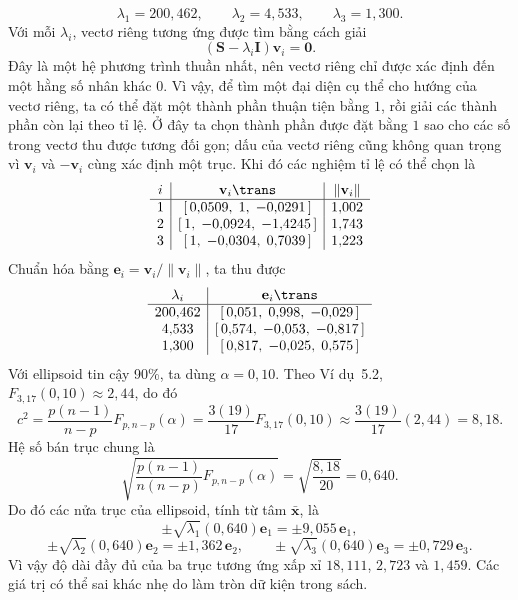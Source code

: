\begin{enumerate}[label=(\alph*)]
    \[
        \lambda_1=200{,}462,\qquad
        \lambda_2=4{,}533,\qquad
        \lambda_3=1{,}300.
    \]
    Với mỗi $\lambda_i$, vectơ riêng tương ứng được tìm bằng cách giải
    \[
        (\mathbf{S}-\lambda_i\mathbf{I})\mathbf{v}_i=\mathbf{0}.
    \]
    Đây là một hệ phương trình thuần nhất, nên vectơ riêng chỉ được xác định đến một hằng số nhân khác $0$. Vì vậy, để tìm một đại diện cụ thể cho hướng của vectơ riêng, ta có thể đặt một thành phần thuận tiện bằng $1$, rồi giải các thành phần còn lại theo tỉ lệ. Ở đây ta chọn thành phần được đặt bằng $1$ sao cho các số trong vectơ thu được tương đối gọn; dấu của vectơ riêng cũng không quan trọng vì $\mathbf{v}_i$ và $-\mathbf{v}_i$ cùng xác định một trục. Khi đó các nghiệm tỉ lệ có thể chọn là
    \[
    \begin{array}{c|c|c}
        i & \mathbf{v}_i\trans & \|\mathbf{v}_i\| \\ \hline
        1 & [\,0{,}0509,\;1,\;-0{,}0291\,] & 1{,}002\\
        2 & [\,1,\;-0{,}0924,\;-1{,}4245\,] & 1{,}743\\
        3 & [\,1,\;-0{,}0304,\;0{,}7039\,] & 1{,}223
    \end{array}
    \]
    Chuẩn hóa bằng $\mathbf{e}_i=\mathbf{v}_i/\|\mathbf{v}_i\|$, ta thu được
    \[
    \begin{array}{c|c}
        \lambda_i & \mathbf{e}_i\trans \\ \hline
        200{,}462 & [\,0{,}051,\;0{,}998,\;-0{,}029\,]\\
        4{,}533 & [\,0{,}574,\;-0{,}053,\;-0{,}817\,]\\
        1{,}300 & [\,0{,}817,\;-0{,}025,\;0{,}575\,]
    \end{array}
    \]
    Với ellipsoid tin cậy 90\%, ta dùng $\alpha=0{,}10$. Theo Ví dụ~5.2, $F_{3,17}(0{,}10)\approx 2{,}44$, do đó
    \[
        c^2 = \frac{p(n-1)}{n-p}F_{p,n-p}(\alpha)
        = \frac{3(19)}{17}F_{3,17}(0{,}10)
        \approx \frac{3(19)}{17}(2{,}44)
        = 8{,}18.
    \]
    Hệ số bán trục chung là
    \[
        \sqrt{\frac{p(n-1)}{n(n-p)}F_{p,n-p}(\alpha)}
        = \sqrt{\frac{8{,}18}{20}}
        = 0{,}640.
    \]
    Do đó các nửa trục của ellipsoid, tính từ tâm $\bar{\mathbf{x}}$, là
    \[
        \pm\sqrt{\lambda_1}(0{,}640)\mathbf{e}_1
        = \pm 9{,}055\,\mathbf{e}_1,
    \]
    \[
        \pm\sqrt{\lambda_2}(0{,}640)\mathbf{e}_2
        = \pm 1{,}362\,\mathbf{e}_2,
        \qquad
        \pm\sqrt{\lambda_3}(0{,}640)\mathbf{e}_3
        = \pm 0{,}729\,\mathbf{e}_3.
    \]
    Vì vậy độ dài đầy đủ của ba trục tương ứng xấp xỉ $18{,}111$, $2{,}723$ và $1{,}459$. Các giá trị có thể sai khác nhẹ do làm tròn dữ kiện trong sách.


\end{enumerate}

